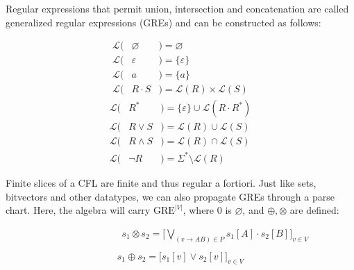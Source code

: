 \documentclass[portrait,a0b,final,a4resizeable]{a0poster}
\def\jointspacing{\vspace{0.3in}}
\begin{document}
\begin{poster}
\begin{multicols}{2}
\pagebreak
      \jointspacing

      \hspace*{2cm}\begin{minipage}[c]{0.90\columnwidth}
Regular expressions that permit union, intersection and concatenation are called generalized regular expressions (GREs) and can be constructed as follows:
\end{minipage}

\vspace{-2cm}
\setlength{\columnseprule}{0pt}
\setlength{\columnsep}{-3cm}
\begin{multicols}{2}
\begin{eqnarray*}
\mathcal{L}(& \varnothing & ) = \varnothing \\
\mathcal{L}(& \varepsilon & ) = \{\varepsilon\} \\
\mathcal{L}(& a           & ) = \{a\}\\
\mathcal{L}(& R\cdot S    & ) = \mathcal{L}(R) \times \mathcal{L}(S)
\end{eqnarray*} \break\vspace{-0.45cm}
\begin{eqnarray*}
\mathcal{L}(& R^*         & ) = \{\varepsilon\} \cup \mathcal{L}(R\cdot R^*)\\
\mathcal{L}(& R\vee S     & ) = \mathcal{L}(R) \cup \mathcal{L}(S)\\
\mathcal{L}(& R\land S    & ) = \mathcal{L}(R) \cap \mathcal{L}(S)\\
\mathcal{L}(& \neg R      & ) = \Sigma^* \setminus \mathcal{L}(R)
\end{eqnarray*}
\end{multicols}

\jointspacing

\hspace*{2cm}\begin{minipage}[c]{0.90\columnwidth}
Finite slices of a CFL are finite and thus regular a fortiori. Just like sets, bitvectors and other datatypes, we can also propagate GREs through a parse chart. Here, the algebra will carry $\text{GRE}^{|V|}$, where 0 is $\varnothing$, and $\oplus, \otimes$ are defined:
\end{minipage}

\vspace{-2cm}
\setlength{\columnseprule}{0pt}
\setlength{\columnsep}{-2cm}
\begin{multicols}{2}
\begin{eqnarray*}
\hspace{3cm}s_1\otimes s_2 = \Big[\bigvee_{(v \rightarrow AB) \in P} s_1[A] \cdot s_2[B] \Big]_{v \in V} \\
\end{eqnarray*} \break\vspace{-0.45cm}
\begin{eqnarray*}
s_1\oplus s_2 = \big[s_1[v] \vee s_2[v]\big]_{v \in V} \\
\end{eqnarray*}
\end{multicols}


\end{multicols}
\end{poster}
\end{document}
